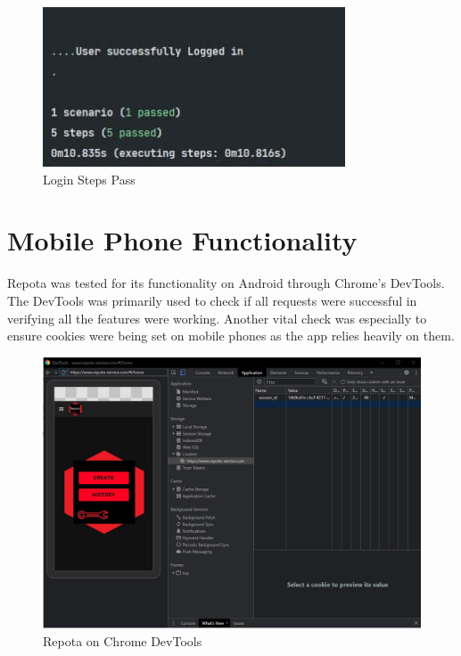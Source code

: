 \begin{figure}[H]
    \centering
    \caption{Login Steps Pass}
    \label{image:loginStepsPass}
    \includegraphics[width=0.8\textwidth]{images/repota/tests/login_pass.png}
\end{figure}

\section{Mobile Phone Functionality}
Repota was tested for its functionality on Android through Chrome's DevTools. The DevTools was primarily used to check if all requests were successful in verifying all the features were working. Another vital check was especially to ensure cookies were being set on mobile phones as the app relies heavily on them.

\begin{figure}[H]
    \centering
    \caption{Repota on Chrome DevTools}
    \label{image:devTools}
    \includegraphics[width=1.0\textwidth]{images/repota/tests/repota_devTools.png}
\end{figure}

